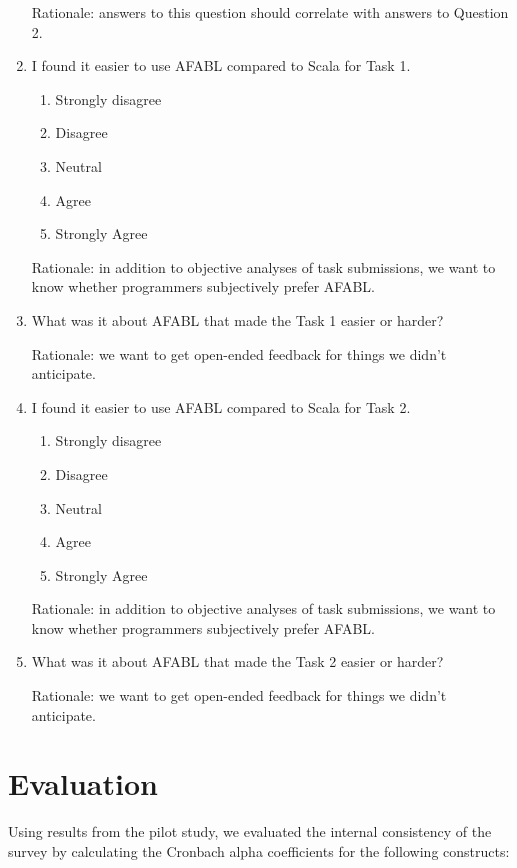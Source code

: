 \begin{enumerate}
Rationale: answers to this question should correlate with answers to Question 2.

\item I found it easier to use AFABL compared to Scala for Task 1.

\begin{enumerate}
\item Strongly disagree
\item Disagree
\item Neutral
\item Agree
\item Strongly Agree
\end{enumerate}

Rationale: in addition to objective analyses of task submissions, we want to know whether programmers subjectively prefer AFABL.

\item What was it about AFABL that made the Task 1 easier or harder?

Rationale: we want to get open-ended feedback for things we didn’t anticipate.

\item I found it easier to use AFABL compared to Scala for Task 2.

\begin{enumerate}
\item Strongly disagree
\item Disagree
\item Neutral
\item Agree
\item Strongly Agree
\end{enumerate}

Rationale: in addition to objective analyses of task submissions, we want to know whether programmers subjectively prefer AFABL.

\item What was it about AFABL that made the Task 2 easier or harder?

Rationale: we want to get open-ended feedback for things we didn’t anticipate.

\end{enumerate}

\section{Evaluation}

Using results from the pilot study, we evaluated the internal consistency of the survey by calculating the Cronbach alpha coefficients for the following constructs:


